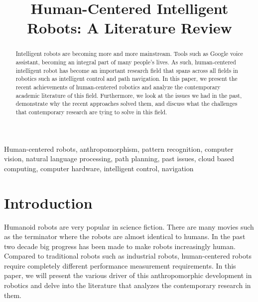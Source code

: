 \documentclass[conference]{IEEEtran}
\begin{document}
\title{Human-Centered Intelligent Robots: A Literature Review\\
}

\author{
\and
{}
}

\maketitle

\begin{abstract}
Intelligent robots are becoming more and more mainstream. Tools such as Google voice assistant, becoming an integral part of many people's lives. As such, human-centered intelligent robot has become an important research field that spans across all fields in robotics such as intelligent control and path navigation. In this paper, we present the recent achievements of human-centered robotics and analyze the contemporary academic literature of this field. Furthermore, we look at the issues we had in the past, demonstrate why the recent approaches solved them, and discuss what the challenges that contemporary research are tying to solve in this field.
\end{abstract}

\begin{IEEEkeywords}
Human-centered robots, anthropomorphism, pattern recognition, computer vision, natural language processing, path planning, past issues, cloud based computing, computer hardware, intelligent control, navigation
\end{IEEEkeywords}

\section{Introduction}
Humanoid robots are very popular in science fiction. There are many movies such as the terminator where the robots are almost identical to humans. In the past two decade big progress has been made to make robots increasingly human. Compared to traditional robots such as industrial robots, human-centered robots require completely different performance measurement requirements\autocite{zinn2004new}. In this paper, we will present the various driver of this anthropomorphic development in robotics and delve into the literature that analyzes the contemporary research in them.
\end{document}
